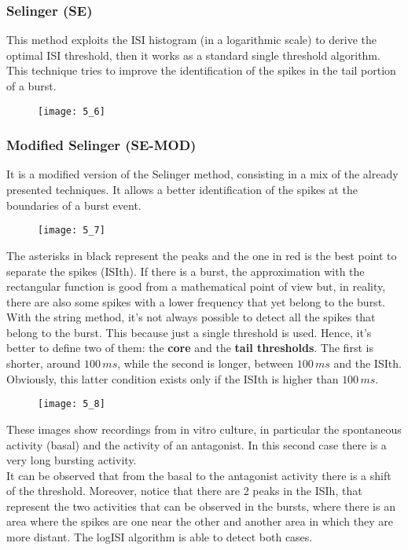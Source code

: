 \subsubsection{Selinger (SE)}
This method exploits the ISI histogram (in a logarithmic scale) to derive the optimal ISI threshold, then it works as a standard single threshold algorithm. This technique tries to improve the identification of the spikes in the tail portion of a burst.
\begin{figure}[H]
    \texttt{[image: 5\_6]}
    \centering
\end{figure}

\subsubsection{Modified Selinger (SE-MOD)}
It is a modified version of the Selinger method, consisting in a mix of the already presented techniques. It allows a better identification of the spikes at the boundaries of a burst event.
\begin{figure}[H]
    \texttt{[image: 5\_7]}
    \centering
\end{figure}
The asterisks in black represent the peaks and the one in red is the best point to separate the spikes (ISIth). If there is a burst, the approximation with the rectangular function is good from a mathematical point of view but, in reality, there are also some spikes with a lower frequency that yet belong to the burst.\\
With the string method, it's not always possible to detect all the spikes that belong to the burst. This because just a single threshold is used. Hence, it's better to define two of them: the \textbf{core} and the \textbf{tail thresholds}. The first is shorter, around \(100\,ms\), while the second is longer, between \(100\,ms\) and the ISIth. Obviously, this latter condition exists only if the ISIth is higher than \(100\,ms\).
\begin{figure}[H]
    \texttt{[image: 5\_8]}
    \centering
\end{figure}
These images show recordings from in vitro culture, in particular the spontaneous activity (basal) and the activity
of an antagonist. In this second case there is a very long bursting activity.\\
It can be observed that from the basal to the antagonist activity there is a shift of the threshold. Moreover, notice that there are 2 peaks in the ISIh, that represent the two activities that can be observed in the bursts, where there is an area where the spikes are one near the other and another area in which they are more distant. The logISI algorithm is able to detect both cases.

